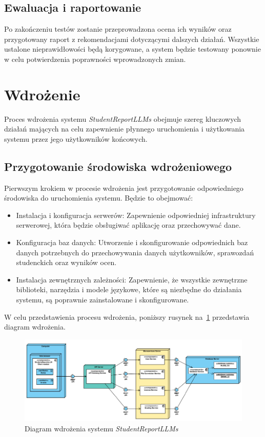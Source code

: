 \documentclass[a4paper, 12pt]{article}
\begin{document}
\subsection{Ewaluacja i raportowanie}

Po zakończeniu testów zostanie przeprowadzona ocena ich wyników oraz przygotowany raport z rekomendacjami dotyczącymi dalszych działań. Wszystkie ustalone nieprawidłowości będą korygowane, a system będzie testowany ponownie w celu potwierdzenia poprawności wprowadzonych zmian.
\section{Wdrożenie}
Proces wdrożenia systemu \textit{StudentReportLLMs} obejmuje szereg kluczowych działań mających na celu zapewnienie płynnego uruchomienia i użytkowania systemu przez jego użytkowników końcowych.

\subsection{Przygotowanie środowiska wdrożeniowego}

Pierwszym krokiem w procesie wdrożenia jest przygotowanie odpowiedniego środowiska do uruchomienia systemu. Będzie to obejmować:

\begin{itemize}
\item Instalacja i konfiguracja serwerów: Zapewnienie odpowiedniej infrastruktury serwerowej, która będzie obsługiwać aplikację oraz przechowywać dane.
\item Konfiguracja baz danych: Utworzenie i skonfigurowanie odpowiednich baz danych potrzebnych do przechowywania danych użytkowników, sprawozdań studenckich oraz wyników ocen.
\item Instalacja zewnętrznych zależności: Zapewnienie, że wszystkie zewnętrzne biblioteki, narzędzia i modele językowe, które są niezbędne do działania systemu, są poprawnie zainstalowane i skonfigurowane.
\end{itemize}

W celu przedstawienia procesu wdrożenia, poniższy rusynek na~\ref{fig:wdrozenie} przedstawia diagram wdrożenia.

\begin{figure}[H]
    \centering
    \includegraphics[width=\textwidth]{img/diagram_wdrozenia}
    \caption{Diagram wdrożenia systemu \textit{StudentReportLLMs}}
    \label{fig:wdrozenie}
\end{figure}
\end{document}
